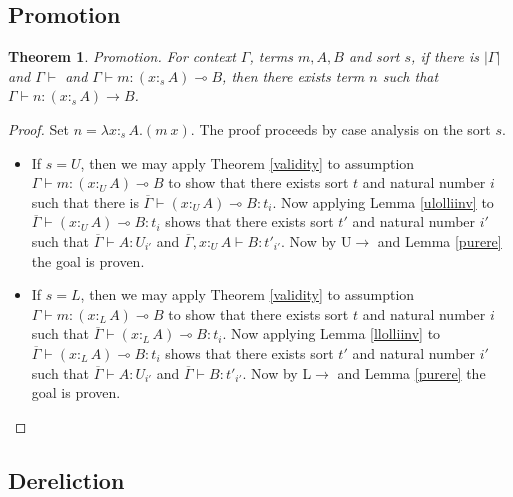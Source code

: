 \documentclass{article}
\newtheorem{theorem}{Theorem}[section]
\theoremstyle{definition}
\newcommand{\rname}[1]{\textsc{\footnotesize #1}}
\newcommand{\pure}[1]{|#1|}
\newcommand{\utype}{:_{\scriptscriptstyle U}}
\newcommand{\ltype}{:_{\scriptscriptstyle L}}
\newcommand{\stype}[1]{:_{#1}}
\begin{document}
\subsection{Promotion}
\begin{theorem}\label{promotion}
  Promotion. For context $\Gamma$, terms $m, A, B$ and sort $s$, if there is $\pure{\Gamma}$ and $\Gamma \vdash$ and $\Gamma \vdash m : (x \stype{s} A) \multimap B$, then there exists term $n$ such that $\Gamma \vdash n : (x \stype{s} A) \rightarrow B$.
\end{theorem}
\begin{proof}
  Set $n = \lambda x \stype{s} A. (m\ x)$. The proof proceeds by case analysis on the sort $s$.
  \begin{itemize}
    \item If $s = U$, then we may apply Theorem \ref{validity} to assumption $\Gamma \vdash m : (x \utype A) \multimap B$ to show that there exists sort $t$ and natural number $i$ such that there is $\overline{\Gamma} \vdash (x \utype A) \multimap B : t_i$. Now applying Lemma \ref{ulolliinv} to $\overline{\Gamma} \vdash (x \utype A) \multimap B : t_i$ shows that there exists sort $t'$ and natural number $i'$ such that $\overline{\Gamma} \vdash A : U_{i'}$ and $\overline{\Gamma}, x \utype A \vdash B : t'_{i'}$. Now by \rname{U$\rightarrow$} and Lemma \ref{purere} the goal is proven.
    \item If $s = L$, then we may apply Theorem \ref{validity} to assumption $\Gamma \vdash m : (x \ltype A) \multimap B$ to show that there exists sort $t$ and natural number $i$ such that $\overline{\Gamma} \vdash (x \ltype A) \multimap B : t_i$. Now applying Lemma \ref{llolliinv} to $\overline{\Gamma} \vdash (x \ltype A) \multimap B : t_i$ shows that there exists sort $t'$ and natural number $i'$ such that $\overline{\Gamma} \vdash A : U_{i'}$ and $\overline{\Gamma} \vdash B : t'_{i'}$. Now by \rname{L$\rightarrow$} and Lemma \ref{purere} the goal is proven.
  \end{itemize}
\end{proof}

\subsection{Dereliction}
\end{document}
